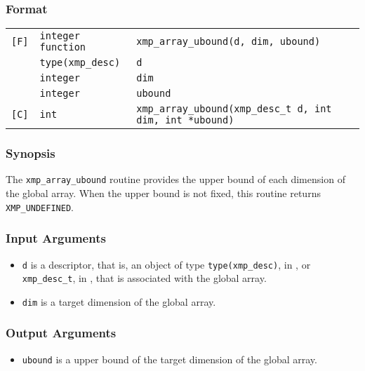 \subsubsection*{Format}

\begin{tabular}{lll}

\verb![F]!& {\tt integer function}& {\tt xmp\_array\_ubound(d, dim, ubound)}\\
          & {\tt type(xmp\_desc)} & {\tt d}\\
          & {\tt integer} & {\tt dim}\\
          & {\tt integer} & {\tt ubound}\\

\verb![C]!&  {\tt int}& {\tt xmp\_array\_ubound(xmp\_desc\_t d, int dim, int *ubound)}\\

\end{tabular}

\subsubsection*{Synopsis}

The {\tt xmp\_array\_ubound} routine provides the upper bound of each dimension of the global array.
  When the upper bound is not fixed, this routine returns {\tt XMP\_UNDEFINED}.

\subsubsection*{Input Arguments}
\begin{itemize}
 \item {\tt d} is a descriptor, that is, an object of type 
       {\tt type(xmp\_desc)}, in {\XMPF}, or {\tt xmp\_desc\_t},
       in {\XMPC}, that is associated with the global array.
 \item {\tt dim} is a target dimension of the global array.
\end{itemize}

\subsubsection*{Output Arguments}
\begin{itemize}
 \item {\tt ubound} is a upper bound of the target dimension of the global array.
\end{itemize}


